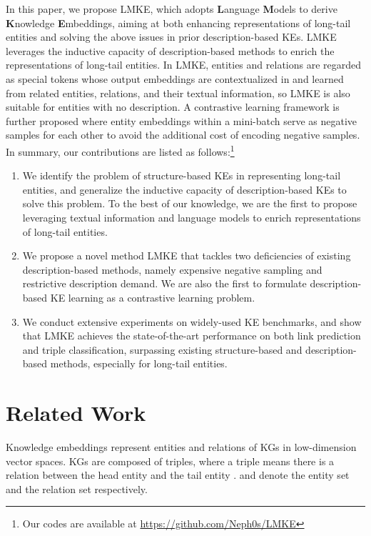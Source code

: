 \documentclass{article}
\begin{document}
In this paper, we propose LMKE, which adopts \textbf{L}anguage \textbf{M}odels to derive  \textbf{K}nowledge \textbf{E}mbeddings,
aiming at both enhancing representations of long-tail entities and solving the above issues in prior description-based KEs.
LMKE leverages the inductive capacity of description-based methods to enrich the representations of long-tail entities.
In LMKE, entities and relations are regarded as special tokens  
whose output embeddings are contextualized in and learned from related entities, relations, and their textual information, 
so LMKE is also suitable for entities with no description.
A contrastive learning framework is further proposed 
where entity embeddings within a mini-batch serve as negative samples for each other 
to avoid the additional cost of encoding negative samples.   
In summary, our contributions are listed as follows:\footnote{Our codes are available at \url{https://github.com/Neph0s/LMKE}}
\begin{enumerate}
\item We identify the problem of structure-based KEs in representing long-tail entities, and generalize the inductive capacity of description-based KEs to solve this problem. 
    To the best of our knowledge, we are the first to propose leveraging textual information and language models to enrich representations of long-tail entities.
\item We propose a novel method LMKE that tackles two deficiencies of existing description-based methods, namely expensive negative sampling and restrictive description demand. 
    We are also the first to formulate description-based KE learning as a contrastive learning problem.
\item We conduct extensive experiments on widely-used \quad KE benchmarks, and show that LMKE achieves the state-of-the-art  performance on both link prediction and triple classification, surpassing existing structure-based and description-based methods, especially for long-tail entities. 
\end{enumerate}







\section{Related Work}
Knowledge embeddings represent entities and relations of KGs in low-dimension vector spaces.
KGs are composed of triples, where a triple  means there is a relation  between the head entity  and the tail entity .  and  denote the entity set and the relation set respectively. 
\end{document}
